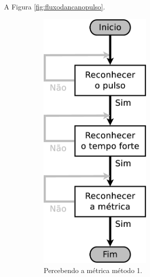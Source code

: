 A Figura \ref{fig:fluxodancanopulso}.

\begin{figure}[h]
    \centering 
\begin{subfigure}[c]{0.45\textwidth}
\centering 
\includegraphics[width=0.6\textwidth]{chapters/cap-musicalidade/dancanopulso1.eps}
\caption{Percebendo a métrica método 1.}
\label{fig:fluxodancanopulso1}
\end{subfigure}
~%
\begin{subfigure}[c]{0.45\textwidth}
\centering 

\end{subfigure}
\end{figure}
